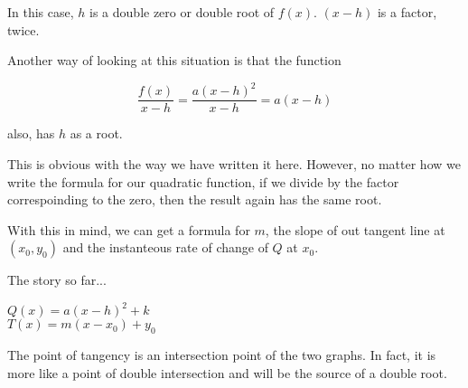 \documentclass{ximera}
\begin{document}
In this case, $h$ is a double zero or double root of $f(x)$.  $(x - h)$ is a factor, twice.


Another way of looking at this situation is that the function


\[
\frac{f(x)}{x-h} = \frac{a (x - h)^2}{x - h} = a (x - h)
\]


also, has $h$ as a root.

This is obvious with the way we have written it here.  However, no matter how we write the formula for our quadratic function, if we divide by the factor correspoinding to the zero, then the result again has the same root.


With this in mind, we can get a formula for $m$, the slope of out tangent line at $(x_0, y_0)$ and the instanteous rate of change of $Q$ at $x_0$.






The story so far...

$Q(x) = a (x - h)^2 + k$ \\

$T(x) = m(x - x_0) + y_0$ \\





\begin{image}
\end{image}
The point of tangency is an intersection point of the two graphs.  In fact, it is more like a point of double intersection and will be the source of a double root.
\end{document}
